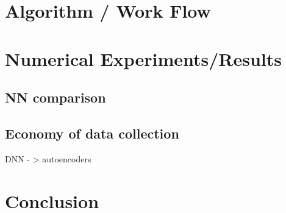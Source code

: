 \documentclass{article}
\begin{document}
 
\section{Algorithm / Work Flow}



\section{Numerical Experiments/Results}


\subsection{NN comparison}

\subsection{Economy of data collection}

DNN - > autoencoders


\section{Conclusion} 
 
 




\end{document}
